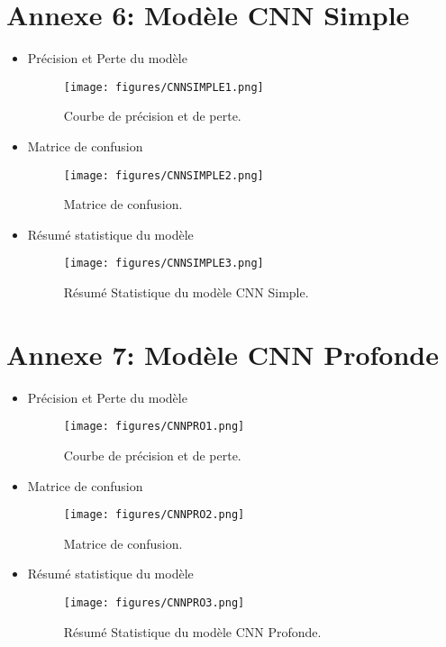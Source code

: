 \section*{Annexe 6: Modèle CNN Simple}
\label{sec:annexe6}
\begin{itemize}
\item Précision et Perte du modèle
\begin{figure}[H]
\centering
\texttt{[image: figures/CNNSIMPLE1.png]}
\caption{Courbe de précision et de perte.}
\label{fig:annexe6.1}
\end{figure}
\item Matrice de confusion
\begin{figure}[H]
\centering
\texttt{[image: figures/CNNSIMPLE2.png]}
\caption{Matrice de confusion.}
\label{fig:annexe6.2}
\end{figure}
\item Résumé statistique du modèle
\begin{figure}[H]
\centering
\texttt{[image: figures/CNNSIMPLE3.png]}
\caption{Résumé Statistique du modèle CNN Simple.}
\label{fig:annexe6.3}
\end{figure}
\end{itemize}



\section*{Annexe 7: Modèle CNN Profonde}
\label{sec:annexe7}
\begin{itemize}
\item Précision et Perte du modèle
\begin{figure}[H]
\centering
\texttt{[image: figures/CNNPRO1.png]}
\caption{Courbe de précision et de perte.}
\label{fig:annexe7.1}
\end{figure}
\item Matrice de confusion
\begin{figure}[H]
\centering
\texttt{[image: figures/CNNPRO2.png]}
\caption{Matrice de confusion.}
\label{fig:annexe7.2}
\end{figure}
\item Résumé statistique du modèle
\begin{figure}[H]
\centering
\texttt{[image: figures/CNNPRO3.png]}
\caption{Résumé Statistique du modèle CNN Profonde.}
\label{fig:annexe7.3}
\end{figure}
\end{itemize}


